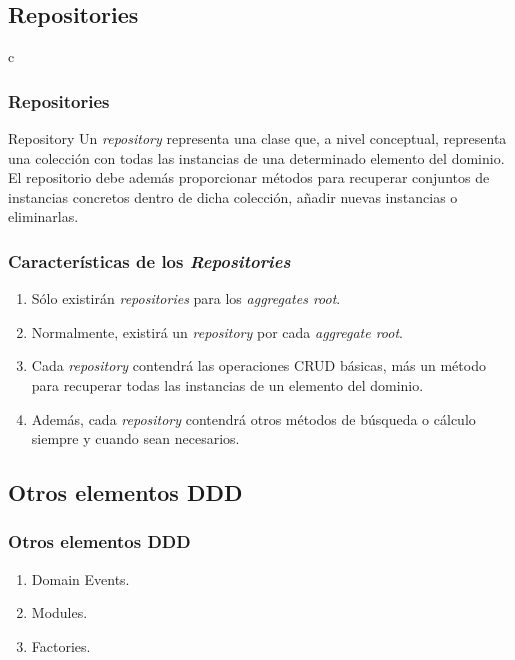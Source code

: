 \documentclass[a4paper,slidestop,xcolor=pst,dvips,blue]{beamer}
\begin{document}
\subsection{Repositories}

\begin{frame}{c}
    \frametitle{Repositories}
    \begin{block}{Repository}
        Un \emph{repository} representa una clase que, a nivel conceptual, representa una colección con todas las instancias de una determinado elemento del dominio. El repositorio debe además proporcionar métodos para recuperar conjuntos de instancias concretos dentro de dicha colección, añadir nuevas instancias o eliminarlas.
    \end{block}
\end{frame}

\begin{frame}[c]
    \frametitle{Características de los \emph{Repositories}}
    \begin{enumerate}[<+->]
        \item Sólo existirán \emph{repositories} para los \emph{aggregates root}.
        \item Normalmente, existirá un \emph{repository} por cada \emph{aggregate root}.
        \item Cada \emph{repository} contendrá las operaciones CRUD básicas, más un método para recuperar todas las instancias de un elemento del dominio.
        \item Además, cada \emph{repository} contendrá otros métodos de búsqueda o cálculo siempre y cuando sean necesarios.
    \end{enumerate}
\end{frame}

\subsection{Otros elementos DDD}

\begin{frame}[c]
    \frametitle{Otros elementos DDD}
    \begin{enumerate}[<+->]
        \item Domain Events.
        \item Modules.
        \item Factories.
    \end{enumerate}
\end{frame}
\end{document}
